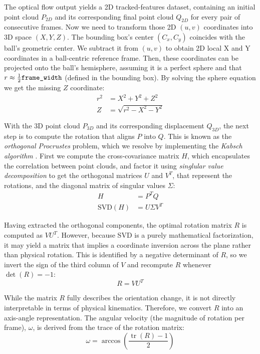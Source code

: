 The optical flow output yields a 2D tracked-features dataset, containing an initial point cloud $P_{2D}$ and its corresponding final point cloud $Q_{2D}$ for every pair of consecutive frames. Now we need to transform those 2D $(u, v)$ coordinates into 3D space $(X, Y, Z)$. The bounding box’s center $(C_x, C_y)$ coincides with the ball’s geometric center. We subtract it from $(u, v)$ to obtain 2D local X and Y coordinates in a ball-centric reference frame. Then, these coordinates can be projected onto the ball’s hemisphere, assuming it is a perfect sphere and that $r\approx \frac{1}{2}\verb|frame_width|$ (defined in the bounding box). By solving the sphere equation we get the missing $Z$ coordinate:
\begin{equation}
    \begin{aligned}
    r^2 &= X^2 + Y^2 + Z^2  \\
    Z &= \sqrt{r^2-X^2-Y^2}
    \end{aligned}
\end{equation}

With the 3D point cloud $P_{3D}$ and its corresponding displacement $Q_{3D}$, the next step is to compute the rotation that aligns $P$ into $Q$. This is known as the \emph{orthogonal Procrustes} problem, which we resolve by implementing the \emph{Kabsch algorithm} \cite{KABSCH76}. First we compute the cross-covariance matrix $H$, which encapsulates the correlation between point clouds, and factor it using \emph{singlular value decomposition} to get the orthogonal matrices $U$ and $V^T$, that represent the rotations, and the diagonal matrix of singular values $\Sigma$:
\begin{equation}
\begin{aligned}
H &= P^T Q \\
\mathrm{SVD}(H) &= U \Sigma V^T
\end{aligned}
\end{equation}

Having extracted the orthogonal components, the optimal rotation matrix $R$ is computed as $ V U^T$. However, because SVD is a purely mathematical factorization, it may yield a matrix that implies a coordinate inversion across the plane rather than physical rotation. This is identified by a negative determinant of $R$, so we invert the sign of the third column of $V$ and recompute $R$ whenever $\det(R) = -1$:
\begin{equation}
R = V U^T
\end{equation}

While the matrix $R$ fully describes the orientation change, it is not directly interpretable in terms of physical kinematics. Therefore, we convert $R$ into an axis-angle representation. The angular velocity (the magnitude of rotation per frame), $\omega$, is derived from the trace of the rotation matrix:
\begin{equation}
\omega = \arccos\left(\frac{\operatorname{tr}(R) - 1}{2}\right)
\end{equation}

